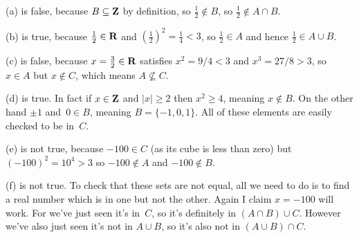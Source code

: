 (a) is false, because $B\subseteq\mathbf{Z}$ by definition, so $\frac{1}{2}\not\in B$, so $\frac{1}{2}\not\in A\cap B$.

(b) is true, because $\frac12\in\mathbf{R}$ and $\left(\frac12\right)^2=\frac14<3$, so $\frac12\in A$ and hence $\frac12\in A\cup B$.

(c) is false, because $x=\frac32\in\mathbf{R}$ satisfies $x^2=9/4<3$ and $x^3=27/8>3$, so $x\in A$ but $x\not\in C$, which means $A\not\subseteq C$.

(d) is true. In fact if $x\in\mathbf{Z}$ and $|x|\geq2$ then $x^2\geq4$, meaning $x\not\in B$. On the other hand $\pm1$ and~$0\in B$, meaning $B=\{-1,0,1\}$. All of these elements are easily checked to be in~$C$.

(e) is not true, because $-100\in C$ (as its cube is less than zero) but $(-100)^2=10^4>3$ so $-100\not\in A$ and $-100\not\in B$.

(f) is not true. To check that these sets are not equal, all we need to do is to find a real number which is in one but not the other. Again I claim $x=-100$ will work. For we've just seen it's in~$C$, so it's definitely in $(A\cap B)\cup C$. However we've also just seen it's not in $A\cup B$, so it's also not in $(A\cup B)\cap C$.
